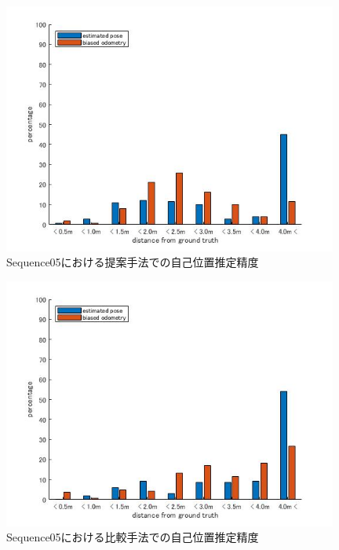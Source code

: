 \begin{figure}[htbp]
  \begin{minipage}{1.0\hsize}
  \begin{center}
   \includegraphics[width=110mm]{./picture/mesh_s5_xyz.jpg}
  \end{center}
  \caption{Sequence05における提案手法での自己位置推定精度}
  \label{fig:mesh_sequence05_XYZ}
 \end{minipage}
\end{figure}

\begin{figure}[htbp]
 \begin{minipage}{1.0\hsize}
  \begin{center}
   \includegraphics[width=110mm]{./picture/point_s5_xyz.jpg}
  \end{center}
  \caption{Sequence05における比較手法での自己位置推定精度}
  \label{fig:point_sequence05_XYZ}
 \end{minipage}
\end{figure}

